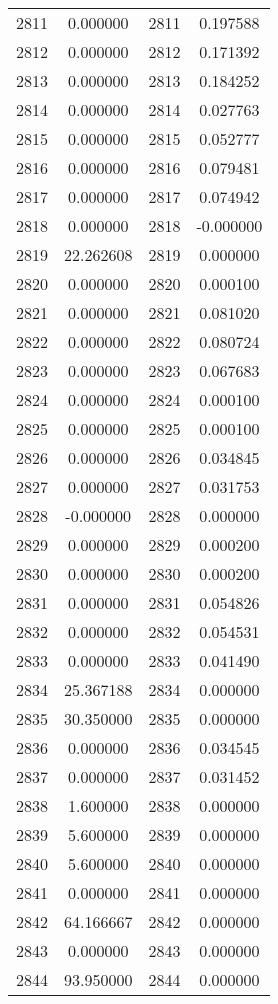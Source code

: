 \documentclass[12pt]{article}
\begin{document}
\begin{longtable}{@{}cccc@{}}
2811 & 0.000000 & 2811 & 0.197588 \\
2812 & 0.000000 & 2812 & 0.171392 \\
2813 & 0.000000 & 2813 & 0.184252 \\
2814 & 0.000000 & 2814 & 0.027763 \\
2815 & 0.000000 & 2815 & 0.052777 \\
2816 & 0.000000 & 2816 & 0.079481 \\
2817 & 0.000000 & 2817 & 0.074942 \\
2818 & 0.000000 & 2818 & -0.000000 \\
2819 & 22.262608 & 2819 & 0.000000 \\
2820 & 0.000000 & 2820 & 0.000100 \\
2821 & 0.000000 & 2821 & 0.081020 \\
2822 & 0.000000 & 2822 & 0.080724 \\
2823 & 0.000000 & 2823 & 0.067683 \\
2824 & 0.000000 & 2824 & 0.000100 \\
2825 & 0.000000 & 2825 & 0.000100 \\
2826 & 0.000000 & 2826 & 0.034845 \\
2827 & 0.000000 & 2827 & 0.031753 \\
2828 & -0.000000 & 2828 & 0.000000 \\
2829 & 0.000000 & 2829 & 0.000200 \\
2830 & 0.000000 & 2830 & 0.000200 \\
2831 & 0.000000 & 2831 & 0.054826 \\
2832 & 0.000000 & 2832 & 0.054531 \\
2833 & 0.000000 & 2833 & 0.041490 \\
2834 & 25.367188 & 2834 & 0.000000 \\
2835 & 30.350000 & 2835 & 0.000000 \\
2836 & 0.000000 & 2836 & 0.034545 \\
2837 & 0.000000 & 2837 & 0.031452 \\
2838 & 1.600000 & 2838 & 0.000000 \\
2839 & 5.600000 & 2839 & 0.000000 \\
2840 & 5.600000 & 2840 & 0.000000 \\
2841 & 0.000000 & 2841 & 0.000000 \\
2842 & 64.166667 & 2842 & 0.000000 \\
2843 & 0.000000 & 2843 & 0.000000 \\
2844 & 93.950000 & 2844 & 0.000000 \\

\end{longtable}
\end{document}
